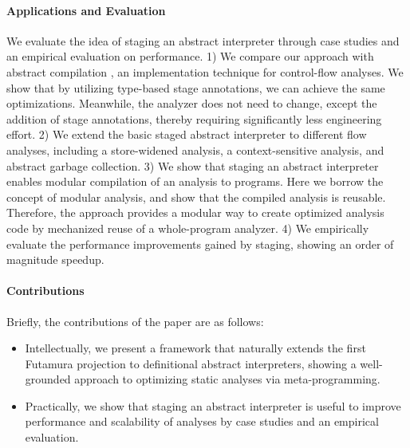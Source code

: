 \paragraph{Applications and Evaluation}
We evaluate the idea of staging an abstract interpreter through
case studies and an empirical evaluation on performance.
1) We compare our approach with abstract compilation
\cite{Boucher:1996:ACN:647473.727587}, an implementation technique for
control-flow analyses. We show that by utilizing type-based stage
annotations, we can achieve the same optimizations. Meanwhile,
the analyzer does not need to change, except the addition of stage annotations,
thereby requiring significantly less engineering effort.
2) We extend the basic staged abstract interpreter to different flow
analyses, including a store-widened analysis, a context-sensitive
analysis, and abstract garbage collection.
3) We show that staging an abstract interpreter enables modular
compilation of an analysis to programs. Here we borrow the concept of
modular analysis, and show that the compiled analysis is reusable.
Therefore, the approach provides a modular way to create optimized
analysis code by mechanized reuse of a whole-program analyzer.
4) We empirically evaluate the performance improvements gained by staging,
showing an order of magnitude speedup.

\paragraph{Contributions} Briefly, the contributions of the paper are as follows:
\begin{itemize}[leftmargin=2em]
  \item Intellectually, we present a framework that naturally extends the first
    Futamura projection to definitional abstract interpreters, showing a
    well-grounded approach to optimizing static analyses via meta-programming.
  \item Practically, we show that staging an abstract interpreter is useful to
    improve performance and scalability of analyses by case studies and an
    empirical evaluation.
\end{itemize}

